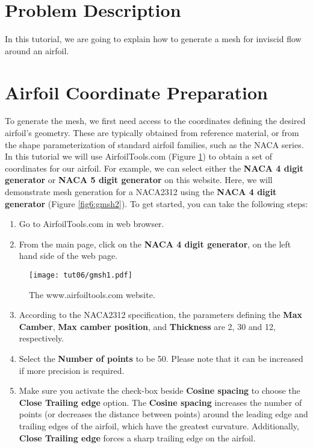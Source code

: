 \section{Problem Description}
In this tutorial, we are going to explain how to generate a mesh for inviscid flow around an airfoil.
\section{Airfoil Coordinate Preparation}
To generate the mesh, we first need access to the coordinates defining the desired airfoil's geometry. These are typically obtained from reference material, or from the shape parameterization of standard airfoil families, such as the NACA series. In this tutorial we will use AirfoilTools.com (Figure \ref{fig6:gmsh1}) to obtain a set of coordinates for our airfoil. For example, we can select either the \textbf{NACA 4 digit generator} or \textbf{NACA 5 digit generator} on this website. Here, we will demonstrate mesh generation for a NACA2312 using the \textbf{NACA 4 digit generator} (Figure \ref{fig6:gmsh2}).
To get started, you can take the following steps:
\begin{enumerate}[label=\arabic*)]
	\setcounter{enumi}{0}
	\item Go to AirfoilTools.com in web browser.
	\item From the main page, click on the \textbf{NACA 4 digit generator}, on the left hand side of the web page.
\end{enumerate}
\begin{figure}[H]
	\centering
	\texttt{[image: tut06/gmsh1.pdf]}
	\caption{The www.airfoiltools.com website.}
	\label{fig6:gmsh1}
\end{figure}
\begin{enumerate}[label=\arabic*)]
	\setcounter{enumi}{2}
	\item According to the NACA2312 specification, the parameters defining the \textbf{Max Camber}, \textbf{Max camber position}, and \textbf{Thickness} are 2, 30 and 12, respectively.
	\item Select the \textbf{Number of points} to be 50. Please note that it can be increased if more precision is required.
	\item Make sure you activate the check-box beside \textbf{Cosine spacing} to choose the \textbf{Close Trailing edge} option. The \textbf{Cosine spacing} increases the number of points (or decreases the distance between points) around the leading edge and trailing edges of the airfoil, which have the greatest curvature. Additionally, \textbf{Close Trailing edge} forces a sharp trailing edge on the airfoil.
\end{enumerate}
